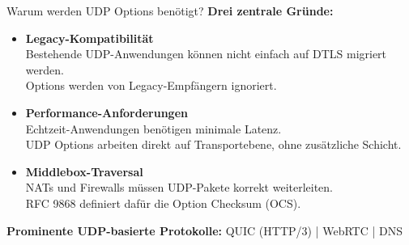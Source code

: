 \documentclass[aspectratio=169]{beamer}
\begin{document}
\begin{frame}{Warum werden UDP Options benötigt?}
\textbf{Drei zentrale Gründe:}

\begin{itemize}
    \item \textbf{Legacy-Kompatibilität} \\
    Bestehende UDP-Anwendungen können nicht einfach auf DTLS migriert werden. \\
    Options werden von Legacy-Empfängern ignoriert.

    \item \textbf{Performance-Anforderungen} \\
    Echtzeit-Anwendungen benötigen minimale Latenz. \\
    UDP Options arbeiten direkt auf Transportebene, ohne zusätzliche Schicht.

    \item \textbf{Middlebox-Traversal} \\
    NATs und Firewalls müssen UDP-Pakete korrekt weiterleiten. \\
    RFC 9868 definiert dafür die Option Checksum (OCS).
\end{itemize}

\vspace{1em}
\textbf{Prominente UDP-basierte Protokolle:} \quad
QUIC (HTTP/3) \quad | \quad WebRTC \quad | \quad DNS
\end{frame}
\end{document}
